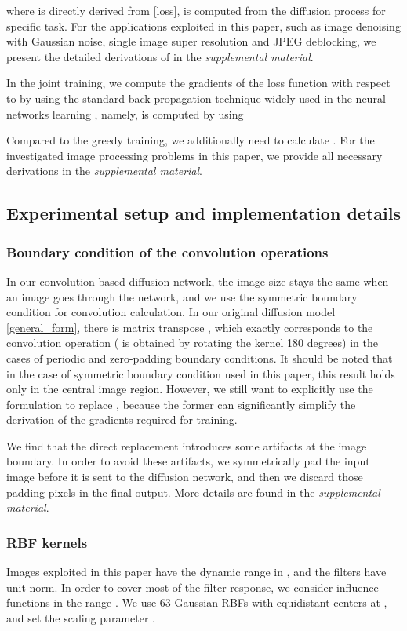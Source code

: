 \documentclass[10pt,journal,compsoc]{IEEEtran}
\begin{document}
where  is directly derived from \eqref{loss}, 
 is computed from the diffusion process for specific task. For the applications exploited in this 
paper, such as 
image denoising with Gaussian noise, single image super resolution and JPEG deblocking, we present the detailed derivations 
of  in the \textit{supplemental material}.



In the joint training, we compute the gradients of the loss function with respect to  by using 
the standard back-propagation technique widely used in the neural networks learning \cite{lecun1998gradient}, namely, 
 is computed by using


Compared to the greedy training, we additionally need to calculate . 
For the investigated image processing problems in this paper, we provide all necessary 
derivations in the \textit{supplemental material}. 

\subsection{Experimental setup and implementation details}
\subsubsection{Boundary condition of the convolution operations}
In our convolution based diffusion network, the image size stays 
the same when an image goes through the network, and 
we use the symmetric boundary condition for convolution calculation. 
In our original diffusion model \eqref{general_form}, there is matrix transpose , which exactly corresponds to 
the convolution operation  ( is obtained by 
rotating the kernel  180 degrees) in the cases of 
periodic and zero-padding boundary conditions. It should be noted that in the case of symmetric boundary condition used in this paper, 
this result holds only in the central image region. 
However, we still want to explicitly use the formulation  to replace , because the former 
can significantly simplify the derivation of the gradients required for training. 

We find that the direct replacement introduces some artifacts at 
the image boundary. In order to avoid these artifacts, 
we symmetrically pad the input image before it is sent to the diffusion network, and then we discard those padding pixels 
in the final output. More details are found in the \textit{supplemental material}. 

\subsubsection{RBF kernels}
Images exploited in this paper have the dynamic range in , and 
the filters have unit norm. 
In order to cover most of the filter response, we consider influence functions in the range . We use 
63 Gaussian RBFs with equidistant centers at , and set the scaling parameter . 
\end{document}
